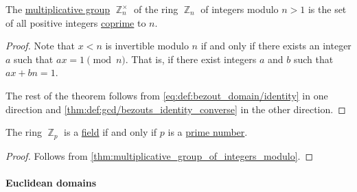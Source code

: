 \begin{proposition}\label{thm:multiplicative_group_of_integers_modulo}
  The \hyperref[def:semiring]{multiplicative group} \( \BbbZ_n^\times \) of the ring \hyperref[def:ring_of_integers_modulo]{\( \BbbZ_n \)} of integers modulo \( n > 1 \) is the set of all positive integers \hyperref[def:coprime_elements]{coprime} to \( n \).
\end{proposition}
\begin{proof}
  Note that \( x < n \) is invertible modulo \( n \) if and only if there exists an integer \( a \) such that \( ax = 1 \pmod n \). That is, if there exist integers \( a \) and \( b \) such that \( ax + bn = 1 \).

  The rest of the theorem follows from \eqref{eq:def:bezout_domain/identity} in one direction and \cref{thm:def:gcd/bezouts_identity_converse} in the other direction.
\end{proof}

\begin{corollary}\label{thm:zp_is_field}
  The ring \( \BbbZ_p \) is a \hyperref[def:field]{field} if and only if \( p \) is a \hyperref[def:prime_number]{prime number}.
\end{corollary}
\begin{proof}
  Follows from \cref{thm:multiplicative_group_of_integers_modulo}.
\end{proof}

\paragraph{Euclidean domains}

